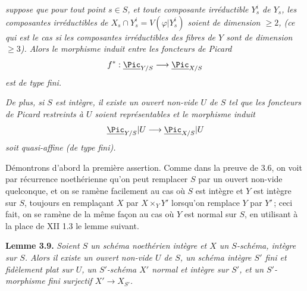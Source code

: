 
\emph{suppose que pour tout point \(s\in S\), et toute composante irr\'eductible \(Y_s^i\) de \(Y_s\), les composantes irr\'eductibles de \(X_s\cap Y_s^i=V(\varphi|Y_s^i)\) soient de dimension \(\ge2\), (ce qui est le cas si les composantes irr\'eductibles des fibres de \(Y\) sont de dimension \(\ge3\)). Alors le morphisme induit entre les foncteurs de Picard}
\[
f^*:\underline{\Pic}_{Y/S}\longrightarrow\underline{\Pic}_{X/S}
\]
\emph{est de type fini.}

\emph{De plus, si \(S\) est int\`egre, il existe un ouvert non-vide \(U\) de \(S\) tel que les foncteurs de Picard restreints \`a \(U\) soient repr\'esentables et le morphisme induit}
\[
\underline{\Pic}_{Y/S}|U\longrightarrow\underline{\Pic}_{X/S}|U
\]
\emph{soit quasi-affine (de type fini).}

D\'emontrons d'abord la premi\`ere assertion. Comme dans la preuve de 3.6, on voit par r\'ecurrence noeth\'erienne qu'on peut remplacer \(S\) par un ouvert non-vide quelconque, et on se ram\`ene facilement au cas o\`u \(S\) est int\`egre et \(Y\) est int\`egre sur \(S\), toujours en rempla\c{c}ant \(X\) par \(X\times_YY'\) lorsqu'on remplace \(Y\) par \(Y'\)\,; ceci fait, on se ram\`ene de la m\^eme fa\c{c}on au cas o\`u \(Y\) est normal sur \(S\), en utilisant \`a la place de XII 1.3 le lemme suivant.

\textbf{Lemme 3.9.} \emph{Soient \(S\) un sch\'ema noeth\'erien int\`egre et \(X\) un \(S\)-sch\'ema, int\`egre sur \(S\). Alors il existe un ouvert non-vide \(U\) de \(S\), un sch\'ema int\`egre \(S'\) fini et fid\`element plat sur \(U\), un \(S'\)-sch\'ema \(X'\) normal et int\`egre sur \(S'\), et un \(S'\)-morphisme fini surjectif \(X'\to X_{S'}\).}

